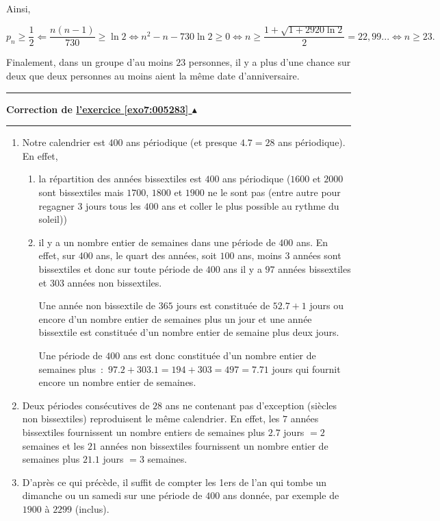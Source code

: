 \documentclass[11pt,a4paper]{article}
\newcounter{exo}
\newcommand{\correction}[1]{\hypertarget{cor7:#1}{}\label{cor7:#1}{\bf Correction de \hyperlink{exo7:#1}{l'exercice \ref{exo7:#1} $\blacktriangle$}}\vspace{1mm}\hrule\vspace{1mm}}
\newcommand{\fincorrection}{\vspace{1mm}\hrule\vspace*{7mm}}
\begin{document}
Ainsi,

$$p_n\geq\frac{1}{2}\Leftarrow\frac{n(n-1)}{730}\geq\ln 2\Leftrightarrow n^2-n-730\ln2\geq0\Leftrightarrow n\geq\frac{1+\sqrt{1+2920\ln2}}{2}=22,99...\Leftrightarrow n\geq23.$$

Finalement, dans un groupe d'au moins $23$ personnes, il y a plus d'une chance sur deux que deux personnes au moins aient la même date d'anniversaire.

\fincorrection
\correction{005283}

\begin{enumerate}
\item  Notre calendrier est $400$ ans périodique (et presque $4.7=28$ ans périodique).
En effet,
\begin{enumerate}
\item la répartition des années bissextiles est $400$ ans périodique ($1600$ et $2000$ sont bissextiles mais $1700$, $1800$ et $1900$ ne le sont pas (entre autre pour regagner $3$ jours tous les $400$ ans et coller le plus possible au rythme du soleil))
\item il y a un nombre entier de semaines dans une période de $400$ ans. En effet, sur $400$ ans, le quart des années, soit $100$ ans, moins $3$ années sont bissextiles et donc sur toute période de $400$ ans il y a $97$ années bissextiles et $303$ années non bissextiles.

Une année non bissextile de $365$ jours est constituée de $52.7+1$ jours ou encore d'un nombre entier de semaines plus un jour et une année bissextile est constituée d'un nombre entier de semaine plus deux jours.

Une période de $400$ ans est donc constituée d'un nombre entier de semaines plus~:~$97.2+303.1=194+303=497=7.71$ jours qui fournit encore un nombre entier de semaines.
\end{enumerate}

\item  Deux périodes consécutives de $28$ ans ne contenant pas d'exception (siècles non bissextiles) reproduisent le même calendrier. En effet, les $7$ années bissextiles fournissent un nombre entiers de semaines plus $2.7$ jours $=2$ semaines et les $21$ années non bissextiles fournissent un nombre entier de semaines plus $21.1$ jours $=3$ semaines.

\item  D'après ce qui précède, il suffit de compter les 1ers de l'an qui tombe un dimanche ou un samedi sur une période de $400$ ans donnée, par exemple de $1900$ à $2299$ (inclus).


\end{enumerate}
\end{document}
